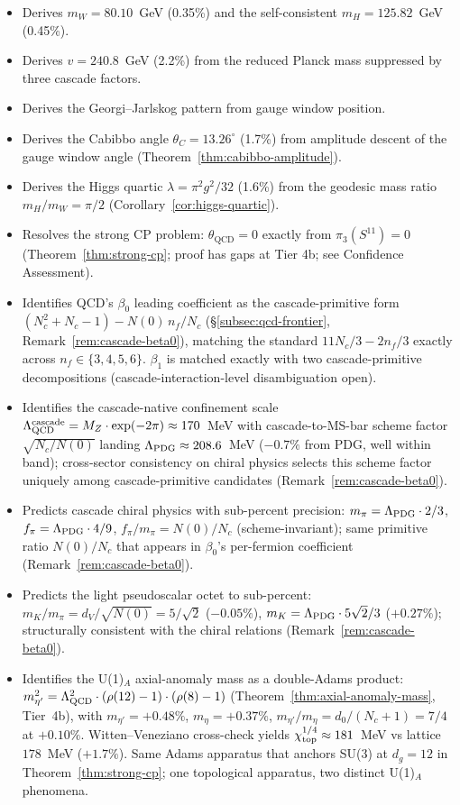 \documentclass[12pt,a4paper]{article}
\begin{document}
\begin{itemize}
\item Derives $m_W = 80.10$~GeV (0.35\%) and the self-consistent $m_H = 125.82$~GeV (0.45\%).
\item Derives $v = 240.8$~GeV (2.2\%) from the reduced Planck mass suppressed by three cascade factors.
\item Derives the Georgi--Jarlskog pattern from gauge window position.
\item Derives the Cabibbo angle $\theta_C = 13.26^\circ$ (1.7\%) from amplitude descent of the gauge window angle (Theorem~\ref{thm:cabibbo-amplitude}).
\item Derives the Higgs quartic $\lambda = \pi^2 g^2/32$ (1.6\%) from the geodesic mass ratio $m_H/m_W = \pi/2$ (Corollary~\ref{cor:higgs-quartic}).
\item Resolves the strong CP problem: $\theta_{\text{QCD}} = 0$ exactly from $\pi_3(S^{11}) = 0$ (Theorem~\ref{thm:strong-cp}; proof has gaps at Tier 4b; see Confidence Assessment).
\item Identifies QCD's $\beta_0$ leading coefficient as the cascade-primitive form $(N_c^2{+}N_c{-}1) - N(0)\,n_f/N_c$ (\S\ref{subsec:qcd-frontier}, Remark~\ref{rem:cascade-beta0}), matching the standard $11N_c/3 - 2n_f/3$ exactly across $n_f\in\{3,4,5,6\}$. $\beta_1$ is matched exactly with two cascade-primitive decompositions (cascade-interaction-level disambiguation open).
\item Identifies the cascade-native confinement scale $\Lambda_{\rm QCD}^{\rm cascade} = M_Z\cdot\exp(-2\pi)\approx 170$~MeV with cascade-to-MS-bar scheme factor $\sqrt{N_c/N(0)}$ landing $\Lambda_{\rm PDG}\approx 208.6$~MeV ($-0.7\%$ from PDG, well within band); cross-sector consistency on chiral physics selects this scheme factor uniquely among cascade-primitive candidates (Remark~\ref{rem:cascade-beta0}).
\item Predicts cascade chiral physics with sub-percent precision: $m_\pi = \Lambda_{\rm PDG}\cdot 2/3$, $f_\pi = \Lambda_{\rm PDG}\cdot 4/9$, $f_\pi/m_\pi = N(0)/N_c$ (scheme-invariant); same primitive ratio $N(0)/N_c$ that appears in $\beta_0$'s per-fermion coefficient (Remark~\ref{rem:cascade-beta0}).
\item Predicts the light pseudoscalar octet to sub-percent: $m_K/m_\pi = d_V/\sqrt{N(0)} = 5/\sqrt{2}$ ($-0.05\%$), $m_K = \Lambda_{\rm PDG}\cdot 5\sqrt{2}/3$ ($+0.27\%$); structurally consistent with the chiral relations (Remark~\ref{rem:cascade-beta0}).
\item Identifies the U(1)$_A$ axial-anomaly mass as a double-Adams product: $m_{\eta'}^2 = \Lambda_{\rm QCD}^2\cdot(\rho(12)-1)\cdot(\rho(8)-1)$ (Theorem~\ref{thm:axial-anomaly-mass}, Tier~4b), with $m_{\eta'} = +0.48\%$, $m_\eta = +0.37\%$, $m_{\eta'}/m_\eta = d_0/(N_c+1)=7/4$ at $+0.10\%$. Witten--Veneziano cross-check yields $\chi_{\rm top}^{1/4} \approx 181$~MeV vs lattice $178$~MeV ($+1.7\%$). Same Adams apparatus that anchors SU(3) at $d_g=12$ in Theorem~\ref{thm:strong-cp}; one topological apparatus, two distinct U(1)$_A$ phenomena.

\end{itemize}
\end{document}
